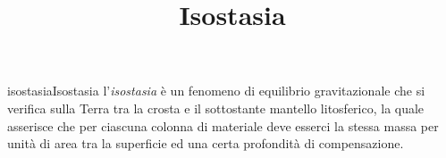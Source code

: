 \documentclass[preview]{standalone}
\begin{document}
\title{Isostasia}
\genpage

\begin{snippetdefinition}{isostasia}{Isostasia}
    l'\textit{isostasia} è un fenomeno di equilibrio gravitazionale
    che si verifica sulla Terra tra la crosta e il sottostante mantello litosferico,
    la quale asserisce che per ciascuna colonna di materiale deve esserci
    la stessa massa per unità di area tra la superficie ed una certa profondità di compensazione.
\end{snippetdefinition}
\end{document}
